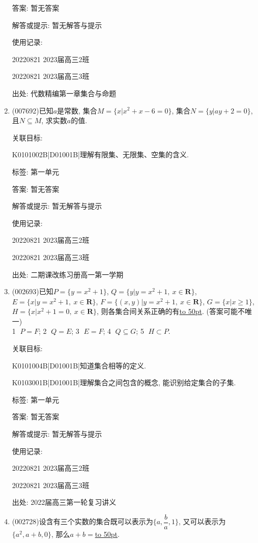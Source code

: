 \documentclass[10pt,a4paper]{article}
\newcommand{\blank}[1]{\underline{\hbox to #1pt{}}}
\begin{document}
\begin{enumerate}[1.]
答案: 暂无答案

解答或提示: 暂无解答与提示

使用记录:

20220821	2023届高三2班	

20220821	2023届高三3班	


出处: 代数精编第一章集合与命题
\item { (007692)}已知$a$是常数, 集合$M=\{x|x^2+x-6=0\}$, 集合$N=\{y|ay+2=0\}$, 且$N\subseteq M$, 求实数$a$的值.


关联目标:

K0101002B|D01001B|理解有限集、无限集、空集的含义.



标签: 第一单元

答案: 暂无答案

解答或提示: 暂无解答与提示

使用记录:

20220821	2023届高三2班	

20220821	2023届高三3班	


出处: 二期课改练习册高一第一学期
\item { (002693)}已知$P=\{y=x^2+1\}$, $Q=\{y|y=x^2+1, \ x\in \mathbf{R}\}$, $E=\{x|y=x^2+1, \  x\in \mathbf{R}\}$, $F=\{(x,y)|y=x^2+1, \ x\in \mathbf{R}\}$, $G=\{x|x\ge 1\}$, $H=\{x|x^2+1=0, \ x\in \mathbf{R}\}$, 则各集合间关系正确的有\blank{50}. (答案可能不唯一)\\
\textcircled{1} $P=F$; \textcircled{2} $Q=E$; \textcircled{3} $E=F$; \textcircled{4} $Q\subseteq G$; \textcircled{5} $H\subset P$.


关联目标:

K0101004B|D01001B|知道集合相等的定义.

K0103001B|D01001B|理解集合之间包含的概念, 能识别给定集合的子集.



标签: 第一单元

答案: 暂无答案

解答或提示: 暂无解答与提示

使用记录:

20220821	2023届高三2班	

20220821	2023届高三3班	


出处: 2022届高三第一轮复习讲义
\item { (002728)}设含有三个实数的集合既可以表示为$\{a,\dfrac ba,1\}$, 又可以表示为$\{a^2,a+b,0\}$, 那么$a+b=$\blank{50}.



\end{enumerate}
\end{document}
